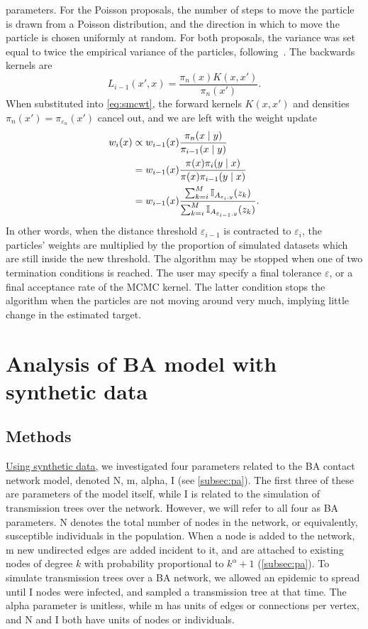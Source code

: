 parameters. For the Poisson proposals, the number of steps to move the particle
is drawn from a Poisson distribution, and the direction in which to move the
particle is chosen uniformly at random. For both proposals, the variance was
set equal to twice the empirical variance of the particles,
following~\autocite{beaumont2009adaptive, del2012adaptive}. The backwards
kernels are
\[
  L_{i-1}(x', x) = \frac{\pi_n(x)K(x, x')}{\pi_n(x')}.
\]
When substituted into \cref{eq:smcwt}, the forward kernels $K(x, x')$ and
densities $\pi_n(x') = \pi_{\varepsilon_n}(x')$ cancel out, and we are left
with the weight update 
\begin{align*}
  w_i(x) 
    &\propto w_{i-1}(x) \frac{\pi_n(x \mid y)}{\pi_{i-1}(x \mid y)} \\
    &= w_{i-1}(x) \frac{\pi(x) \pi_i(y \mid x)}{\pi(x) \pi_{i-1}(y \mid x)} \\
    &= w_{i-1}(x) \frac{\sum_{k=i}^M \mathbb{I}_{A_{\varepsilon_i, y}}(z_k)}
            {\sum_{k=i}^M \mathbb{I}_{A_{\varepsilon_{i-1}, y}}(z_k)}.
\end{align*}
In other words, when the distance threshold $\varepsilon_{i-1}$ is contracted
to $\varepsilon_i$, the particles' weights are multiplied by the proportion of
simulated datasets which are still inside the new threshold. The algorithm may
be stopped when one of two termination conditions is reached. The user may
specify a final tolerance $\varepsilon$, or a final acceptance rate of the
\gls{MCMC} kernel. The latter condition stops the algorithm when the particles
are not moving around very much, implying little change in the estimated
target.

\section{Analysis of \acrlong{BA} model with synthetic data}
\label{sec:ba}

\subsection{Methods}

{\color{blue}\uline{Using synthetic data,}} we investigated four parameters
related to the \gls{BA} contact network model, denoted \gls{N}, \gls{m},
\gls{alpha}, \gls{I} (see \cref{subsec:pa}). The first three of these are
parameters of the model itself, while \gls{I} is related to the simulation of
transmission trees over the network. However, we will refer to all four as
\gls{BA} parameters. \gls{N} denotes the total number of nodes in the network,
or equivalently, susceptible individuals in the population. When a node is
added to the network, \gls{m} new undirected edges are added incident to it,
and are attached to existing nodes of degree $k$ with probability proportional
to $k^\alpha + 1$ (\cref{subsec:pa}). To simulate transmission trees over a
\gls{BA} network, we allowed an epidemic to spread until \gls{I} nodes were
infected, and sampled a transmission tree at that time. The \gls{alpha}
parameter is unitless, while \gls{m} has units of edges or connections per
vertex, and \gls{N} and \gls{I} both have units of nodes or individuals.

